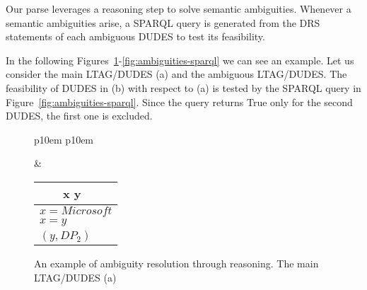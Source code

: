 Our parse leverages a reasoning step to solve semantic ambiguities.
%
Whenever a semantic ambiguities arise, a SPARQL query is generated from the DRS statements of each ambiguous DUDES to test its feasibility.

In the following Figures~\ref{fig:ambiguities-resolution-a}-\ref{fig:ambiguities-sparql} we can see an example.
%
Let us consider the main LTAG/DUDES (a) and the ambiguous LTAG/DUDES.
%
The feasibility of DUDES in (b) with respect to (a) is tested by the SPARQL query in Figure~\ref{fig:ambiguities-sparql}. Since the query returns True only for the second DUDES, the first one is excluded.

\begin{figure}[tp]
\caption{An example of ambiguity resolution through reasoning. The main LTAG/DUDES (a)}
\label{fig:ambiguities-resolution-a}
\begin{tabular}{ p{10em} p{10em} }
	\begin{center}
	\begin{tikzpicture}
	\Tree [.S [.VP [.V is ] [.DP$_1$ Microsoft ] ] [.DP$_2\downarrow$ ] ]
	\end{tikzpicture}
	\end{center}		
	&
	\begin{center}
	\begin{tabular}{|c|l|}
		\hline
		\mbox{} & x y \\ 
		\hline
		\multicolumn{2}{|l|}{
			$x=Microsoft$
		}\\
		\multicolumn{2}{|l|}{
			$x=y$
		}\\
		\hline
		\multicolumn{2}{|l|}{
			\mbox{$(y,DP_2)$}
		}\\
		\hline
	\end{tabular}
	\end{center}
\end{tabular}
\end{figure}

